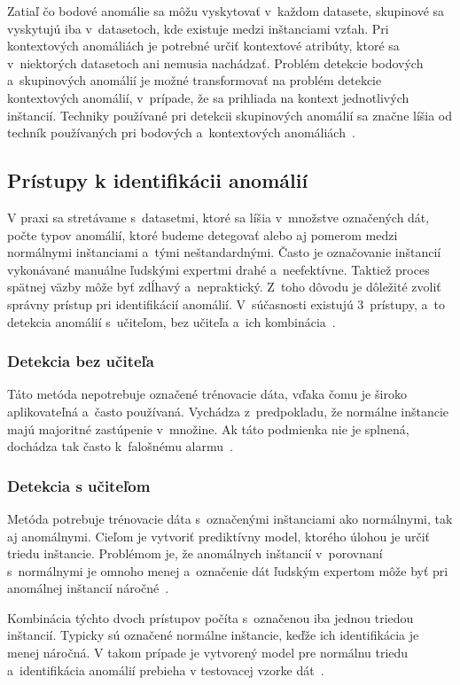 \documentclass[a4paper,twoside,slovak,12pt]{article}
\begin{document}
Zatiaľ čo bodové anomálie sa môžu vyskytovať v~každom datasete, skupinové sa
vyskytujú iba v~datasetoch, kde existuje medzi inštanciami vzťah. Pri kontextových
anomáliách je potrebné určiť kontextové atribúty, ktoré sa v~niektorých
datasetoch ani nemusia nachádzať. Problém detekcie bodových a~skupinových
anomálií je možné transformovať na problém detekcie kontextových anomálií,
v~prípade, že sa prihliada na kontext jednotlivých inštancií. Techniky používané
pri detekcii skupinových anomálií sa značne líšia od techník používaných pri
bodových a~kontextových anomáliách~\cite{Chandola2009}.

\subsection{Prístupy k identifikácii anomálií}
V praxi sa stretávame s~datasetmi, ktoré sa líšia v~množstve označených dát,
počte typov anomálií, ktoré budeme detegovať alebo aj pomerom medzi normálnymi
inštanciami a~tými neštandardnými. Často je označovanie inštancií vykonávané
manuálne ľudskými expertmi drahé a~neefektívne. Taktiež proces spätnej väzby
môže byť zdĺhavý a~nepraktický. Z~toho dôvodu je dôležité zvoliť správny
prístup pri identifikácií anomálií. V~súčasnosti existujú 3~prístupy, a~to
detekcia anomálií s~učiteľom, bez učiteľa a~ich kombinácia~\cite{Chandola2009}.

\subsubsection{Detekcia bez učiteľa}
Táto metóda nepotrebuje označené trénovacie dáta, vďaka čomu je široko
aplikovateľná a~často používaná. Vychádza z~predpokladu, že normálne inštancie
majú majoritné zastúpenie v~množine. Ak táto podmienka nie je splnená, dochádza
tak často k~falošnému alarmu~\cite{Chandola2009}.

\subsubsection{Detekcia s učiteľom}
Metóda potrebuje trénovacie dáta s~označenými inštanciami ako normálnymi, tak aj
anomálnymi. Cieľom je vytvoriť prediktívny model, ktorého úlohou je určiť triedu
inštancie. Problémom je, že anomálnych inštancií v~porovnaní s~normálnymi je
omnoho menej a~označenie dát ľudským expertom môže byť pri anomálnej inštancií
náročné~\cite{Chandola2009}.

Kombinácia týchto dvoch prístupov počíta s~označenou iba jednou triedou
inštancií. Typicky sú označené normálne inštancie, keďže ich identifikácia je
menej náročná. V takom prípade je vytvorený model pre normálnu triedu
a~identifikácia anomálií prebieha v testovacej vzorke dát~\cite{Chandola2009}.
\end{document}
